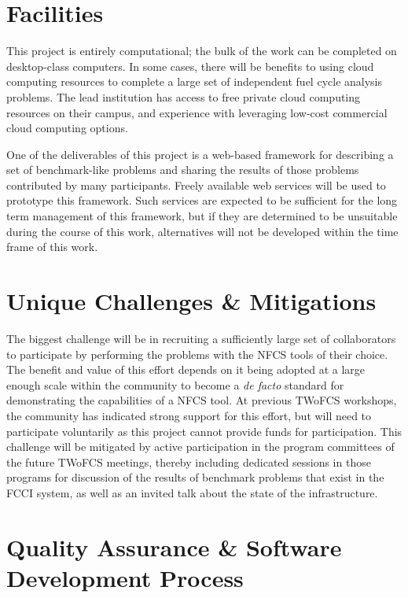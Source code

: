\section{Facilities}

This project is entirely computational; the bulk of the work can be completed
on desktop-class computers.  In some cases, there will be benefits to using
cloud computing resources to complete a large set of independent fuel cycle
analysis problems.  The lead institution has access to free private cloud
computing resources on their campus, and experience with leveraging low-cost
commercial cloud computing options.

One of the deliverables of this project is a web-based framework for
describing a set of benchmark-like problems and sharing the results of those
problems contributed by many participants.  Freely available web services will
be used to prototype this framework.  Such services are expected to be
sufficient for the long term management of this framework, but if they are
determined to be unsuitable during the course of this work, alternatives will
not be developed within the time frame of this work.

\section{Unique Challenges \& Mitigations}

The biggest challenge will be in recruiting a sufficiently large set of
collaborators to participate by performing the problems with the \gls{NFCS}
tools of their choice.  The benefit and value of this effort depends on it
being adopted at a large enough scale within the community to become a
\emph{de facto} standard for demonstrating the capabilities of a \gls{NFCS}
tool.  At previous TWoFCS workshops, the community has indicated strong
support for this effort, but will need to participate voluntarily as this
project cannot provide funds for participation.  This challenge will be
mitigated by active participation in the program committees of the future
TWoFCS meetings, thereby including dedicated sessions in those programs for
discussion of the results of benchmark problems that exist in the \gls{FCCI}
system, as well as an invited talk about the state of the infrastructure.

\section{Quality Assurance \& Software Development Process}

